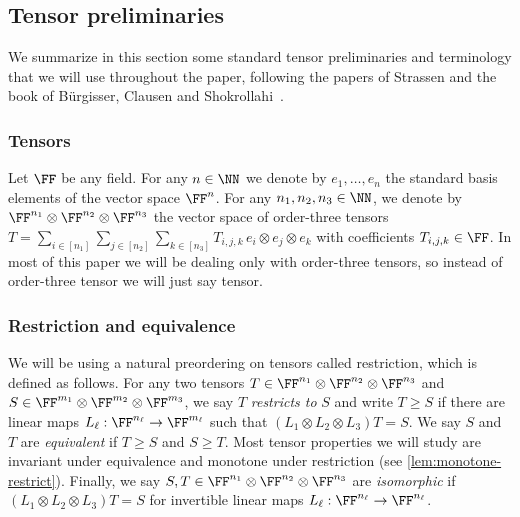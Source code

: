 \subsection{Tensor preliminaries}\label{subsec:prelim}

We summarize in this section some standard tensor preliminaries and terminology that we will use throughout the paper, following the papers of Strassen \cite{MR882307,strassen1988asymptotic,strassen1991degeneration} and the book of Bürgisser, Clausen and Shokrollahi~\cite{burgisser1997algebraic}.


\subsubsection*{Tensors}
%
%
Let $\FF$ be any field. For any $n \in \NN$ we denote by $e_1, \ldots, e_n$ the standard basis elements of the vector space $\FF^n$. For any $n_1, n_2, n_3 \in \NN$, we denote by $\FF^{n_1} \otimes \FF^{n_2} \otimes \FF^{n_3}$ the vector space of order-three tensors $T = \sum_{i \in [n_1]} \sum_{j \in [n_2]} \sum_{k \in [n_3]} T_{i,j,k}\, e_i \otimes e_j \otimes e_k$ with coefficients $T_{i,j,k} \in \FF$. In most of this paper we will be dealing only with order-three tensors, so instead of order-three tensor we will just say tensor. 

%
\subsubsection*{Restriction and equivalence} 
We will be using a natural preordering on tensors called restriction, which is defined as follows. For any two tensors $T \in \FF^{n_1} \otimes \FF^{n_2} \otimes \FF^{n_3}$ and $S \in \FF^{m_1} \otimes \FF^{m_2} \otimes \FF^{m_3}$, we say $T$ \emph{restricts to} $S$ and write $T \geq S$ if there are linear maps $L_\ell : \FF^{n_\ell} \to \FF^{m_\ell}$ such that $(L_1 \otimes L_2 \otimes L_3)T = S$. We say $S$ and $T$ are \emph{equivalent} if $T \geq S$ and $S \geq T$. Most tensor properties we will study are invariant under equivalence and monotone under restriction (see \autoref{lem:monotone-restrict}). Finally, we say $S, T \in \FF^{n_1} \otimes \FF^{n_2} \otimes \FF^{n_3}$ are \emph{isomorphic} if $(L_1 \otimes L_2 \otimes L_3)T = S$ for invertible linear maps $L_\ell : \FF^{n_\ell} \to \FF^{n_\ell}$.
%

